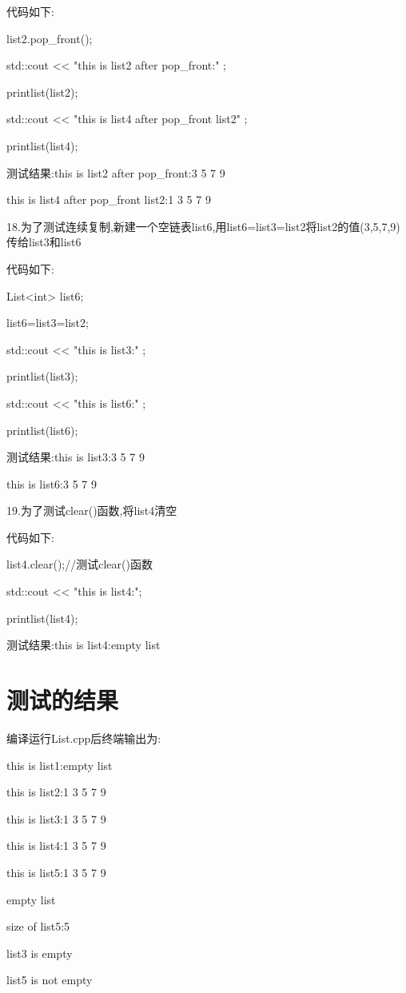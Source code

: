 \documentclass[UTF8]{ctexart}
\begin{document}
    代码如下:
    
    list2.pop\_front();
    
    std::cout << "this is list2 after pop\_front:" ;
    
    printlist(list2);
    
    std::cout << "this is list4 after pop\_front list2" ;
    
    printlist(list4);

测试结果:this is list2 after pop\_front:3 5 7 9

this is list4 after pop\_front list2:1 3 5 7 9

18.为了测试连续复制,新建一个空链表list6,用list6=list3=list2将list2的值(3,5,7,9)传给list3和list6

代码如下:

    List<int> list6;
    
    list6=list3=list2;
    
    std::cout << "this is list3:" ;
    
    printlist(list3);
    
    std::cout << "this is list6:" ;
    
    printlist(list6);

测试结果:this is list3:3 5 7 9

this is list6:3 5 7 9

19.为了测试clear()函数,将list4清空

代码如下:

list4.clear();//测试clear()函数

std::cout << "this is list4:";

printlist(list4);

测试结果:this is list4:empty list

\section{测试的结果}

编译运行List.cpp后终端输出为:

this is list1:empty list

this is list2:1 3 5 7 9

this is list3:1 3 5 7 9

this is list4:1 3 5 7 9

this is list5:1 3 5 7 9

empty list

size of list5:5

list3 is empty

list5 is not empty
\end{document}
